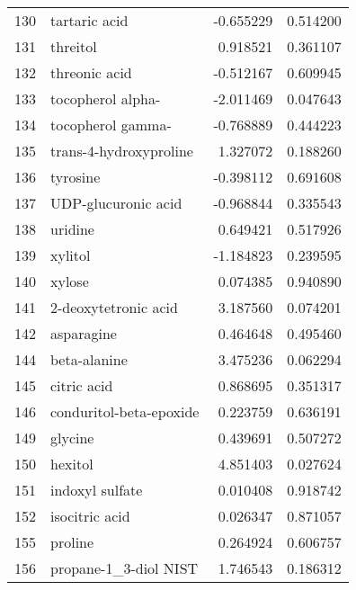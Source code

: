 \begin{tabular}{llrr}
130 &                      tartaric acid & -0.655229 &  0.514200 \\
131 &                           threitol &  0.918521 &  0.361107 \\
132 &                      threonic acid & -0.512167 &  0.609945 \\
133 &                  tocopherol alpha- & -2.011469 &  0.047643 \\
134 &                  tocopherol gamma- & -0.768889 &  0.444223 \\
135 &             trans-4-hydroxyproline &  1.327072 &  0.188260 \\
136 &                           tyrosine & -0.398112 &  0.691608 \\
137 &                UDP-glucuronic acid & -0.968844 &  0.335543 \\
138 &                            uridine &  0.649421 &  0.517926 \\
139 &                            xylitol & -1.184823 &  0.239595 \\
140 &                             xylose &  0.074385 &  0.940890 \\
141 &               2-deoxytetronic acid &  3.187560 &  0.074201 \\
142 &                         asparagine &  0.464648 &  0.495460 \\
144 &                       beta-alanine &  3.475236 &  0.062294 \\
145 &                        citric acid &  0.868695 &  0.351317 \\
146 &            conduritol-beta-epoxide &  0.223759 &  0.636191 \\
149 &                            glycine &  0.439691 &  0.507272 \\
150 &                            hexitol &  4.851403 &  0.027624 \\
151 &                    indoxyl sulfate &  0.010408 &  0.918742 \\
152 &                     isocitric acid &  0.026347 &  0.871057 \\
155 &                            proline &  0.264924 &  0.606757 \\
156 &              propane-1\_3-diol NIST &  1.746543 &  0.186312 \\
\bottomrule
\end{tabular}
